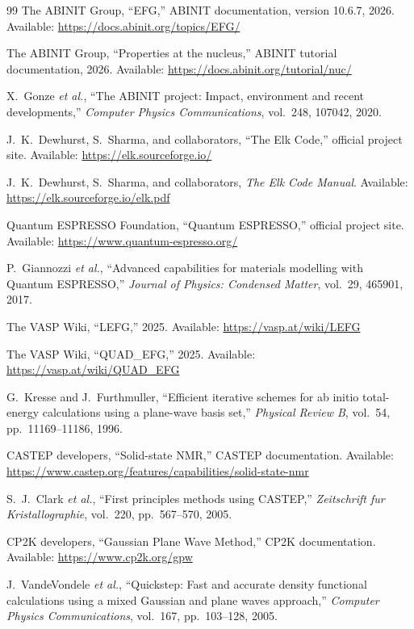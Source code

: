 \documentclass[11pt]{article}
\begin{document}
\begin{thebibliography}{99}
The ABINIT Group, ``EFG,'' ABINIT documentation, version 10.6.7, 2026.  Available: \url{https://docs.abinit.org/topics/EFG/}

The ABINIT Group, ``Properties at the nucleus,'' ABINIT tutorial documentation, 2026.  Available: \url{https://docs.abinit.org/tutorial/nuc/}

X.~Gonze \emph{et al.}, ``The ABINIT project: Impact, environment and recent developments,'' \emph{Computer Physics Communications}, vol.~248, 107042, 2020.

J.~K.~Dewhurst, S.~Sharma, and collaborators, ``The Elk Code,'' official project site.  Available: \url{https://elk.sourceforge.io/}

J.~K.~Dewhurst, S.~Sharma, and collaborators, \emph{The Elk Code Manual}.  Available: \url{https://elk.sourceforge.io/elk.pdf}

Quantum ESPRESSO Foundation, ``Quantum ESPRESSO,'' official project site. Available: \url{https://www.quantum-espresso.org/}

P.~Giannozzi \emph{et al.}, ``Advanced capabilities for materials modelling with Quantum ESPRESSO,'' \emph{Journal of Physics: Condensed Matter}, vol.~29, 465901, 2017.

The VASP Wiki, ``LEFG,'' 2025. Available: \url{https://vasp.at/wiki/LEFG}

The VASP Wiki, ``QUAD\_EFG,'' 2025. Available: \url{https://vasp.at/wiki/QUAD_EFG}

G.~Kresse and J.~Furthmuller, ``Efficient iterative schemes for ab initio total-energy calculations using a plane-wave basis set,'' \emph{Physical Review B}, vol.~54, pp.~11169--11186, 1996.

CASTEP developers, ``Solid-state NMR,'' CASTEP documentation. Available: \url{https://www.castep.org/features/capabilities/solid-state-nmr}

S.~J.~Clark \emph{et al.}, ``First principles methods using CASTEP,'' \emph{Zeitschrift fur Kristallographie}, vol.~220, pp.~567--570, 2005.

CP2K developers, ``Gaussian Plane Wave Method,'' CP2K documentation. Available: \url{https://www.cp2k.org/gpw}

J.~VandeVondele \emph{et al.}, ``Quickstep: Fast and accurate density functional calculations using a mixed Gaussian and plane waves approach,'' \emph{Computer Physics Communications}, vol.~167, pp.~103--128, 2005.


\end{thebibliography}
\end{document}
